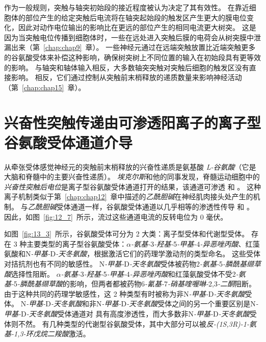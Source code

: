 作为一般规则，突触与轴突初始段的接近程度被认为决定了其有效性。
在靠近细胞体的部位产生的给定突触后电流将在轴突起始段的触发区产生更大的膜电位变化，因此对动作电位输出的影响比在更远的部位产生的相同电流更大树突。
这是因为当突触电位传播到细胞体时，一些在远处进入突触后膜的电荷会从树突膜中泄漏出来（第~\ref{chap:chap9}~章）。
一些神经元通过在远端突触放置比近端突触更多的谷氨酸受体来补偿这种影响，确保树突树上不同位置的输入在初始段具有更等效的影响。
与轴突和轴体输入相反，大多数轴突突触对突触后细胞的触发区没有直接影响。
相反，它们通过控制从突触前末梢释放的递质数量来影响神经活动（第~\ref{chap:chap15}~章）。



\section{兴奋性突触传递由可渗透阳离子的离子型谷氨酸受体通道介导}

从牵张受体感觉神经元的突触前末梢释放的兴奋性递质是氨基酸 \textit{L-谷氨酸}（它是大脑和脊髓中的主要兴奋性递质）。
\textit{埃克尔斯}和他的同事发现，脊髓运动细胞中的\textit{兴奋性突触后电位}是离子型谷氨酸受体通道打开的结果，该通道可渗透  和 。
这种离子机制类似于第~\ref{chap:chap12}~章中描述的\textit{乙酰胆碱}在神经肌肉接头处产生的机制。
与\textit{乙酰胆碱}受体通道一样，谷氨酸受体通道以几乎相等的渗透性传导  和 。
因此，如图~\ref{fig:12_7}~所示，流过这些通道电流的反转电位为 0 毫伏。


如图~\ref{fig:13_3}~所示，谷氨酸受体可分为 2 大类：离子型受体和代谢型受体。
存在 3 种主要类型的离子型谷氨酸受体：\textit{$\alpha$-氨基-}3\textit{-羟基-}5\textit{-甲基-}4\textit{-异恶唑丙酸}、红藻氨酸和N\textit{-甲基-}D\textit{-天冬氨酸}，根据激活它们的药理学激动剂的类型命名。
这些受体对拮抗剂也有不同的敏感性。
N\textit{-甲基-}D\textit{-天冬氨酸}受体被药物2\textit{-氨基-}5\textit{-膦酰基缬草酸}选择性阻断。
\textit{$\alpha$-氨基-}3\textit{-羟基-}5\textit{-甲基-}4\textit{-异恶唑丙酸}和红藻氨酸受体不受2\textit{-氨基-}5\textit{-膦酰基缬草酸}的影响，但两者都被药物6\textit{-氰基-}7\textit{-硝基喹喔啉-}2,3\textit{-二酮}阻断。
由于这种共同的药理学敏感性，这 2 种类型有时被称为非N\textit{-甲基-}D\textit{-天冬氨酸}受体。
N\textit{-甲基-}D\textit{-天冬氨酸}和非N\textit{-甲基-}D\textit{-天冬氨酸}受体之间的另一个重要区别是N\textit{-甲基-}D\textit{-天冬氨酸}受体通道对  具有高度渗透性，而大多数非N\textit{-甲基-}D\textit{-天冬氨酸}受体则不然。
有几种类型的代谢型谷氨酸受体，其中大部分可以被\textit{反-(1S,3R)-1-氨基-1,3-环戊烷二羧酸}激活。


